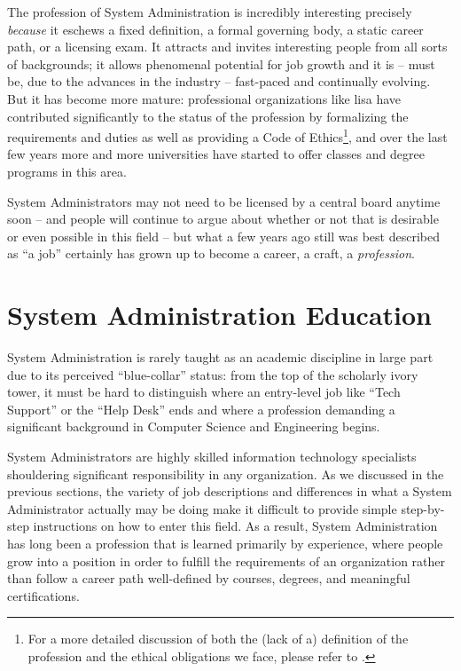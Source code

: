 The profession of System Administration is incredibly
interesting precisely {\em because} it eschews a fixed
definition, a formal governing body, a static career
path, or a licensing exam.  It attracts and invites
interesting people from all sorts of backgrounds; it
allows phenomenal potential for job growth and it is
-- must be, due to the advances in the industry --
fast-paced and continually evolving.  But it has
become more mature: professional organizations like
\gls{lisa} have contributed significantly to the
status of the profession by formalizing the
requirements and duties as well as providing a Code of
Ethics\footnote{For a more detailed discussion of both
the (lack of a) definition of the profession and the
ethical obligations we face, please refer to
\cite{intro:primum-non-nocere}.}, and over the last
few years more and more universities have started to
offer classes and degree programs in this area.

System Administrators may not need to be licensed by a
central board anytime soon -- and people will continue
to argue about whether or not that is desirable or
even possible in this field -- but what a few years
ago still was best described as ``a job'' certainly
has grown up to become a career, a craft, a {\em
profession}.

\section{System Administration Education}
\label{introduction:education}

System Administration is rarely taught as an academic
discipline in large part due to its perceived
``blue-collar'' status: from the top of the scholarly
ivory tower, it must be hard to distinguish where an
entry-level job like ``Tech Support'' or the ``Help
Desk'' ends and where a profession demanding a
significant background in Computer Science and
Engineering begins.

System Administrators are highly skilled information
technology specialists shouldering significant
responsibility in any organization.  As we discussed
in the previous sections, the variety of job
descriptions and differences in what a System
Administrator actually may be doing make it difficult
to provide simple step-by-step instructions on how to
enter this field.  As a result, System Administration
has long been a profession that is learned primarily
by experience, where people grow into a position in
order to fulfill the requirements of an organization
rather than follow a career path well-defined by
courses, degrees, and meaningful certifications.

